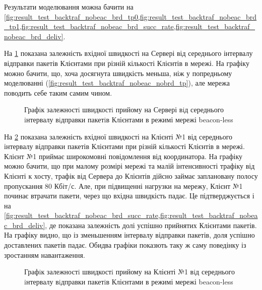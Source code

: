 \documentclass[a4paper,ukrainian,utf8,nocolumnsxix,floatsection,equationsection]{eskdtext}
\newcommand{\longcaption}[1]{\captionsetup{style=figureLongCaption}\caption{#1}}
\newcommand{\blm}[0]{beacon-less\xspace}
\begin{document}
Результати моделювання можна бачити на \cref{fig:result_test_backtraf_nobeac_brd_tp0,fig:result_test_backtraf_nobeac_brd_tp1,fig:result_test_backtraf_nobeac_brd_succ_rate,fig:result_test_backtraf_nobeac_brd_deliv}.



На \cref{fig:result_test_backtraf_nobeac_brd_tp0} показана залежність вхідної швидкості на Сервері від середнього інтервалу відправки пакетів Клієнтами при різній кількості Клієнтів в мережі. На графіку можно бачити, що, хоча досягнута швидкість меньша, ніж у попредньому моделюванні (\cref{fig:result_test_backtraf_nobeac_nobrd_tp}), але мережа поводить себе таким самим чином.
\begin{figure}[htbp]
	\centering
	\longcaption{\label{fig:result_test_backtraf_nobeac_brd_tp0}Графiк залежностi швидкостi прийому на Сервері вiд середнього iнтервалу вiдправки пакетiв Клієнтами в режимі мережі \blm}
\end{figure}


На \cref{fig:result_test_backtraf_nobeac_brd_tp1} показана залежність вхідної швидкості на Клієнті №1 від середнього інтервалу відправки пакетів Клієнтами при різній кількості Клієнтів в мережі. Клієнт №1 приймає широкомовні повідомлення від координатора. На графіку можно бачити, що при малому розмірі мережі та малій інтенсивності трафіку від Клієнті к хосту, трафік від Сервера до Клієнтів дійсно займає заплановану полосу пропускання 80 Кбіт/с. Але, при підвищенні нагрузки на мережу, Клієнт №1 починає втрачати пакети, через що вхідна швидкість падає. Це підтверджується і на \cref{fig:result_test_backtraf_nobeac_brd_succ_rate,fig:result_test_backtraf_nobeac_brd_deliv}, де показана залежність долі успішно прийнятих Клієнтами пакетів. На графіку видно, що із зменьшенням інтервалу відправки пакетів, доля успішно доставлених пакетів падає. Обидва графіки показють таку ж саму поведінку із зростанням навантаження. 

\begin{figure}[htbp]
	\centering
	\longcaption{\label{fig:result_test_backtraf_nobeac_brd_tp1}Графiк залежностi швидкостi прийому на Клієнті №1 вiд середнього iнтервалу вiдправки пакетiв Клієнтами в режимі мережі \blm}
\end{figure}
\end{document}

